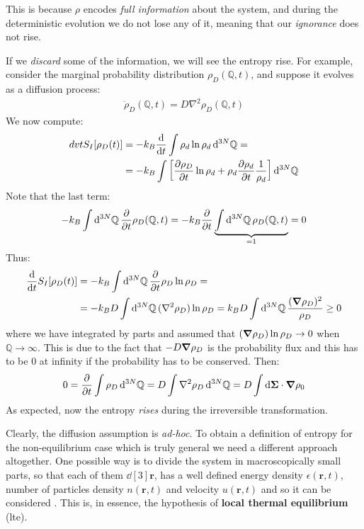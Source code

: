 \documentclass[../../main.tex]{subfiles}
\begin{document}
\medskip

This is because $\rho$ encodes \textit{full information} about the system, and during the deterministic evolution we do not lose any of it, meaning that our \textit{ignorance} does not rise.

\medskip

If we \textit{discard} some of the information, we will see the entropy rise. For example, consider the marginal probability distribution $\rho_D(\mathbb{Q}, t)$, and suppose it evolves as a diffusion process:
\begin{align} \label{eqn:93}
    \dot{\rho}_D(\mathbb{Q},t) = D \nabla^2 \rho_D(\mathbb{Q},t)
\end{align} 
We now compute:
\begin{align*}
    dv{t} S_I[\rho_D(t)] &= -k_B \dv{t} \int \rho_d \ln \rho_d \dd[3N]{\mathbb{Q}} = \\
    &= -k_B \int \left[\pdv{\rho_D}{t} \ln \rho_d + \rho_d \pdv{\rho_d}{t} \frac{1}{\rho_d} \right] \dd[3N]{\mathbb{Q}}
\end{align*}
Note that the last term:
\begin{align*}
    -k_B \int \dd[3N]{\mathbb{Q}} \pdv{t} \rho_D(\mathbb{Q},t) = -k_B \pdv{t} \underbrace{\int \dd[3N]{\mathbb{Q}} \rho_D(\mathbb{Q},t)}_{=1} = 0 
\end{align*}
Thus:
\begin{align}\label{eqn:94}
    \dv{t} S_I[\rho_D(t)] &= -k_B \int \dd[3N]{\mathbb{Q}} \pdv{t} \rho_D \ln \rho_D = \\
    &= -k_B D \int \dd[3N]{\mathbb{Q}} (\nabla^2 \rho_D) \ln \rho_D = k_B D \int \dd[3N]{\mathbb{Q}} \frac{(\grad \rho_D)^2}{\rho_D} \geq 0 
\end{align}
where we have integrated by parts and assumed that $(\grad \rho_D) \ln \rho_D \to 0$ when $\mathbb{Q} \to \infty$. This is due to the fact that $-D \grad \rho_D$ is the probability flux and this has to be $0$ at infinity if the probability has to be conserved. Then:
\begin{align}\label{eqn:95}
    0 = \pdv{t} \int \rho_D \dd[3N]{\mathbb{Q}} = D \int \nabla^2 \rho_D \dd[3N]{\mathbb{Q}} =D \int \dd{\bm{\Sigma}} \cdot \grad \rho_0
\end{align}
As expected, now the entropy \textit{rises} during the irreversible transformation.

\medskip

Clearly, the diffusion assumption is \textit{ad-hoc}. To obtain a definition of entropy for the non-equilibrium case which is truly general we need a different approach altogether. One possible way is to divide the system in macroscopically small parts, so that each of them $\dd[3]{\bm{r}}$, has a well defined energy density $\epsilon(\bm{r},t)$, number of particles density $n(\bm{r},t)$ and velocity $u(\bm{r},t)$ and so it can be considered . This is, in essence, the hypothesis of \textbf{local thermal equilibrium} (lte).
\end{document}

